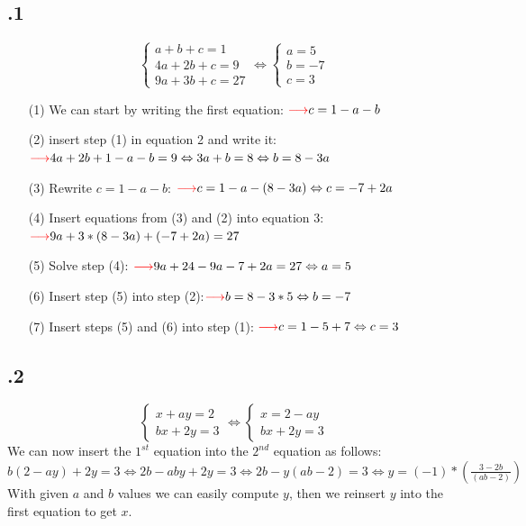 \documentclass[a4paper]{article}
\begin{document}
\subsection*{.1}
$$\begin{cases}a + b + c = 1\\ 4a + 2b + c = 9 \\ 9a + 3b + c =27\end{cases} \Leftrightarrow  \begin{cases} a=5\\b=-7\\c=3\end{cases}$$
\begin{itemize}
\item[(1)] We can start by writing the first equation: ${\color{red}\longrightarrow} c = 1 -a -b$
\item[(2)] insert step (1) in equation 2 and write it: ${\color{red}\longrightarrow} 4a +2b +1 -a -b = 9 \Leftrightarrow 3a + b = 8 \Leftrightarrow b = 8 - 3a$
\item[(3)] Rewrite $c = 1 -a -b$: ${\color{red}\longrightarrow} c = 1 -a -(8 - 3a) \Leftrightarrow c = -7 + 2a$
\item[(4)] Insert equations from (3) and (2) into equation 3:${\color{red}\longrightarrow} 9a + 3*(8 - 3a) + (-7 + 2a) = 27$
\item[(5)] Solve step (4): ${\color{red}\longrightarrow} 9a + 24 -9a -7 +2a = 27 \Leftrightarrow a = 5$
\item[(6)] Insert step (5) into step (2):${\color{red}\longrightarrow} b = 8 -3*5 \Leftrightarrow b = -7$
\item[(7)] Insert steps (5) and (6) into step (1): ${\color{red}\longrightarrow} c = 1 - 5 + 7 \Leftrightarrow c = 3$
\end{itemize}


\subsection*{.2}
$$\begin{cases}x + ay = 2\\ bx + 2y = 3\end{cases} \Leftrightarrow \begin{cases}x = 2 - ay\\ bx + 2y = 3\end{cases}$$
We can now insert the $1^{st}$ equation into the $2^{nd}$ equation as follows:\\
$b(2 - ay) + 2y = 3 \Leftrightarrow 2b - aby + 2y = 3 \Leftrightarrow 2b - y(ab -2) = 3 \Leftrightarrow y = (-1) * \left( \frac{3 - 2b}{(ab - 2)} \right) $\\
With given $a$ and $b$ values we can easily compute $y$, then we reinsert $y$ into the first equation to get $x$.
\end{document}

